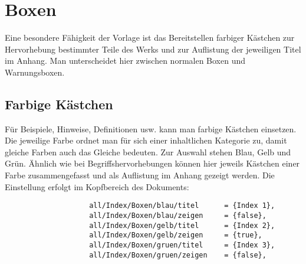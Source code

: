 			\newline
		
		\section{Boxen}
		
			Eine besondere Fähigkeit der Vorlage ist das Bereitstellen farbiger Kästchen zur Hervorhebung bestimmter Teile des Werks und zur Auflistung der jeweiligen Titel im Anhang. Man unterscheidet hier zwischen normalen Boxen und Warnungsboxen. 
			
			\subsection{Farbige Kästchen}
			
				Für Beispiele, Hinweise, Definitionen usw. kann man farbige Kästchen einsetzen. Die jeweilige Farbe ordnet man für sich einer inhaltlichen Kategorie zu, damit gleiche Farben auch das Gleiche bedeuten. Zur Auswahl stehen Blau, Gelb und Grün. Ähnlich wie bei Begriffshervorhebungen können hier jeweils Kästchen einer Farbe zusammengefasst und als Auflistung im Anhang gezeigt werden. Die Einstellung erfolgt im Kopfbereich des Dokuments: 
				
				\begin{verbatim}
					all/Index/Boxen/blau/titel      = {Index 1},
					all/Index/Boxen/blau/zeigen     = {false},
					all/Index/Boxen/gelb/titel      = {Index 2},
					all/Index/Boxen/gelb/zeigen     = {true},
					all/Index/Boxen/gruen/titel     = {Index 3},
					all/Index/Boxen/gruen/zeigen    = {false},
				\end{verbatim}
				

